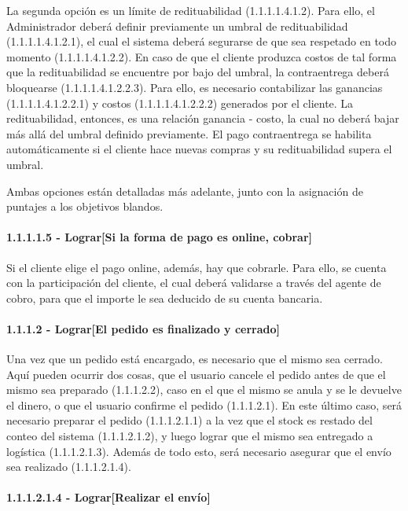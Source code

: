 La segunda opción es un límite de redituabilidad (1.1.1.1.4.1.2).
Para ello, el Administrador deberá definir previamente un umbral de
redituabilidad (1.1.1.1.4.1.2.1), el cual el sistema deberá segurarse de que sea
respetado en todo momento (1.1.1.1.4.1.2.2). En caso de que el cliente produzca
costos de tal forma que la redituabilidad se encuentre por bajo del umbral, la
contraentrega deberá bloquearse (1.1.1.1.4.1.2.2.3). Para ello, es necesario
contabilizar las ganancias (1.1.1.1.4.1.2.2.1) y costos (1.1.1.1.4.1.2.2.2)
generados por el cliente. La redituabilidad, entonces, es una relación
ganancia - costo, la cual no deberá bajar más allá del umbral definido
previamente. El pago contraentrega se habilita automáticamente si el cliente
hace nuevas compras y su redituabilidad supera el umbral.

Ambas opciones están detalladas más adelante, junto con la asignación de
puntajes a los objetivos blandos.

\paragraph{1.1.1.1.5 - Lograr[Si la forma de pago es online, cobrar]} \label{para:1.1.1.1.5}

Si el cliente elige el pago online, además, hay que cobrarle. Para ello, se
cuenta con la participación del cliente, el cual deberá validarse a través del
agente de cobro, para que el importe le sea deducido de su cuenta bancaria.

\clearpage
\paragraph{1.1.1.2 - Lograr[El pedido es finalizado y cerrado]} \label{para:1.1.1.2}

Una vez que un pedido está encargado, es necesario que el mismo sea cerrado.
Aquí pueden ocurrir dos cosas, que el usuario cancele el pedido antes de que el
mismo sea preparado (1.1.1.2.2), caso en el que el mismo se anula y se le
devuelve el dinero, o que el usuario confirme el pedido (1.1.1.2.1). En este
último caso, será necesario preparar el pedido (1.1.1.2.1.1) a la vez que el
stock es restado del conteo del sistema (1.1.1.2.1.2), y luego lograr que el
mismo sea entregado a logística (1.1.1.2.1.3). Además de todo esto, será
necesario asegurar que el envío sea realizado (1.1.1.2.1.4).

\paragraph{1.1.1.2.1.4 - Lograr[Realizar el envío]} \label{para:1.1.1.2.1.4}

